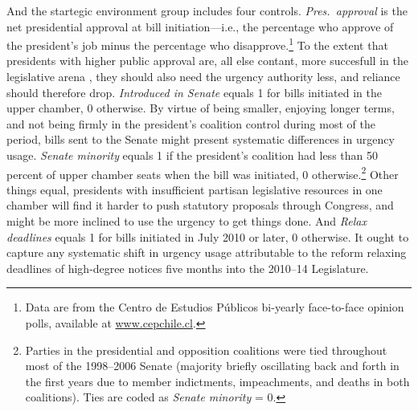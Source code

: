 \documentclass[letter,12pt]{article}
\begin{document}
And the startegic environment group includes four controls. \emph{Pres.~approval} is the net presidential approval at bill initiation---i.e., the percentage who approve of the president's job minus the percentage who disapprove.\footnote{Data are from the Centro de Estudios P\'ublicos bi-yearly face-to-face opinion polls, available at \url{www.cepchile.cl}.} To the extent that presidents with higher public approval are, all else contant, more succesfull in the legislative arena \citep{bond.fleisher.1990,aleman.navia.UrgChi.2009}, they should also need the urgency authority less, and reliance should therefore drop. \emph{Introduced in Senate} equals 1 for bills initiated in the upper chamber, 0 otherwise. By virtue of being smaller, enjoying longer terms, and not being firmly in the president's coalition control during most of the period, bills sent to the Senate might present systematic differences in urgency usage. \emph{Senate minority} equals 1 if the president's coalition had less than 50 percent of upper chamber seats when the bill was initiated, 0 otherwise.\footnote{Parties in the presidential and opposition coalitions were tied throughout most of the 1998--2006 Senate (majority briefly oscillating back and forth in the first years due to member indictments, impeachments, and deaths in both coalitions). Ties are coded as \emph{Senate minority} = 0.} Other things equal, presidents with insufficient partisan legislative resources in one chamber will find it harder to push statutory proposals through Congress, and might be more inclined to use the urgency to get things done. And \emph{Relax deadlines} equals 1 for bills initiated in July 2010 or later, 0 otherwise. It ought to capture any systematic shift in urgency usage attributable to the reform relaxing deadlines of high-degree notices five months into the 2010--14 Legislature. 
\end{document}

